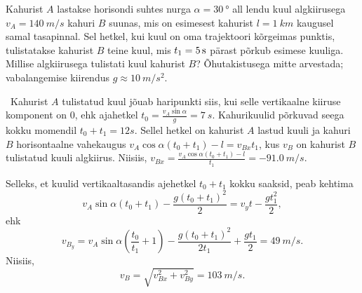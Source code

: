 
Kahurist $A$ lastakse horisondi suhtes nurga $\alpha=\SI{30}{\degree}$ all lendu kuul algkiirusega $v_A=\SI{140}{m/s}$ kahuri $B$ suunas, mis on esimesest kahurist $l=\SI{1}{km}$ kaugusel samal tasapinnal. Sel hetkel, kui kuul on oma trajektoori kõrgeimas punktis, tulistatakse kahurist $B$ teine kuul, mis $t_1=\SI 5s$ pärast põrkub  esimese kuuliga. Millise algkiirusega tulistati kuul kahurist $B$? Õhutakistusega mitte arvestada; vabalangemise kiirendus $g\approx\SI{10}{m/s^2}$.




\hint

\solu
\
Kahurist $A$ tulistatud kuul jõuab haripunkti siis, kui selle vertikaalne kiiruse komponent on $0$, ehk ajahetkel $t_0 = \frac{v_A\sin\alpha}{g} = \SI{7}{s}$. Kahurikuulid põrkuvad seega kokku momendil $t_0 + t_1 = \SI{12}s$. Sellel hetkel on kahurist $A$ lastud kuuli ja kahuri $B$ horisontaalne vahekaugus $v_A\cos\alpha(t_0 + t_1) - l = v_{Bx}t_1$, kus $v_B$ on kahurist $B$ tulistatud kuuli algkiirus. Niisiis, $v_{Bx} = \frac{v_A\cos\alpha(t_0 + t_1) - l}{t_1} = \SI{-91.0}{m/s}$.

Selleks, et kuulid vertikaaltasandis ajehetkel $t_0 + t_1$ kokku saaksid, peab kehtima
\[
v_A\sin\alpha (t_0 + t_1) - \frac{g(t_0 + t_1)^2}{2} = v_yt - \frac{gt_1^2}{2},
\]
ehk
\[
v_{B_y} = v_A\sin\alpha \left(\frac{t_0}{t_1} + 1\right) - \frac{g(t_0 + t_1)^2}{2t_1} + \frac{gt_1}{2} = \SI{49}{m/s}.
\]
Niisiis,
\[
v_B = \sqrt{v_{Bx}^2 + v_{By}^2} = \SI{103}{m/s}.
\]
\probend
